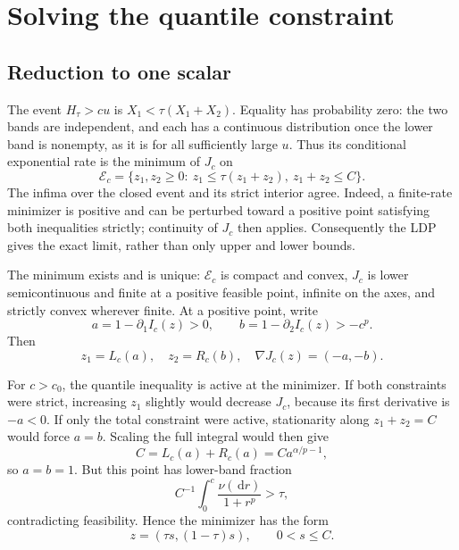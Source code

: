 \documentclass[11pt,letterpaper]{article}
\numberwithin{equation}{section}
\theoremstyle{definition}
\theoremstyle{remark}
\newcommand{\dd}{\,\mathrm d}
\begin{document}
\section{Solving the quantile constraint}\label{sec:optimization}

\subsection{Reduction to one scalar}

The event $H_\tau>cu$ is $X_1<\tau(X_1+X_2)$. Equality has probability zero: the two bands are independent, and each has a continuous distribution once the lower band is nonempty, as it is for all sufficiently large $u$. Thus its conditional exponential rate is the minimum of $J_c$ on
\begin{equation}\label{eq:feasible}
 \mathcal E_c=\{z_1,z_2\ge0:\ z_1\le\tau(z_1+z_2),\ z_1+z_2\le C\}.
\end{equation}
The infima over the closed event and its strict interior agree. Indeed, a finite-rate minimizer is positive and can be perturbed toward a positive point satisfying both inequalities strictly; continuity of $J_c$ then applies. Consequently the LDP gives the exact limit, rather than only upper and lower bounds.

The minimum exists and is unique: $\mathcal E_c$ is compact and convex, $J_c$ is lower semicontinuous and finite at a positive feasible point, infinite on the axes, and strictly convex wherever finite. At a positive point, write
\begin{equation}\label{eq:dualab}
 a=1-\partial_1 I_c(z)>0,\qquad
 b=1-\partial_2 I_c(z)>-c^p.
\end{equation}
Then
\begin{equation}\label{eq:meanab}
 z_1=L_c(a),\quad z_2=R_c(b),\quad\nabla J_c(z)=(-a,-b).
\end{equation}

For $c>c_0$, the quantile inequality is active at the minimizer. If both constraints were strict, increasing $z_1$ slightly would decrease $J_c$, because its first derivative is $-a<0$. If only the total constraint were active, stationarity along $z_1+z_2=C$ would force $a=b$. Scaling the full integral would then give
\[
 C=L_c(a)+R_c(a)=Ca^{\alpha/p-1},
\]
so $a=b=1$. But this point has lower-band fraction
\[
 C^{-1}\int_0^c\frac{\nu(\dd r)}{1+r^p}>\tau,
\]
contradicting feasibility. Hence the minimizer has the form
\begin{equation}\label{eq:line}
 z=(\tau s,(1-\tau)s),\qquad 0<s\le C.
\end{equation}
\end{document}
